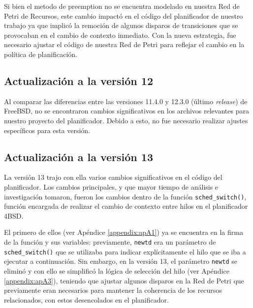 Si bien el metodo de preemption no se encuentra modelado en nuestra Red de Petri de Recursos, este cambio impactó en el código del planificador de nuestro trabajo ya que implicó la remoción de algunos disparos de transiciones que se provocaban en el cambio de contexto inmediato. Con la nueva estrategia, fue necesario ajustar el código de nuestra Red de Petri para reflejar el cambio en la política de planificación.\par

\subsection{Actualización a la versión 12}

Al comparar las diferencias entre las versiones 11.4.0 y 12.3.0 (último \textit{release}) de FreeBSD, no se encontraron cambios significativos en los archivos relevantes para nuestro proyecto del planificador. Debido a esto, no fue necesario realizar ajustes específicos para esta versión.\par


\subsection{Actualización a la versión 13}

La versión 13 trajo con ella varios cambios significativos en el código del planificador. Los cambios principales, y que mayor tiempo de análisis e investigación tomaron, fueron los cambios dentro de la función \verb|sched_switch()|, función encargada de realizar el cambio de contexto entre hilos en el planificador 4BSD.\par

El primero de ellos (ver Apéndice \ref{appendix:apA1}) ya se encuentra en la firma de la función y sus variables: previamente, \verb|newtd| era un parámetro de \verb|sched_switch()| que se utilizaba para indicar explícitamente el hilo que se iba a ejecutar a continuación. Sin embargo, en la versión 13, el parámetro \verb|newtd| se eliminó y con ello se simplificó la lógica de selección del hilo (ver Apéndice \ref{appendix:apA3}), teniendo que ajustar algunos disparos en la Red de Petri que previamente eran necesarios para mantener la coherencia de los recursos relacionados, con estos desencolados en el planificador.\par

